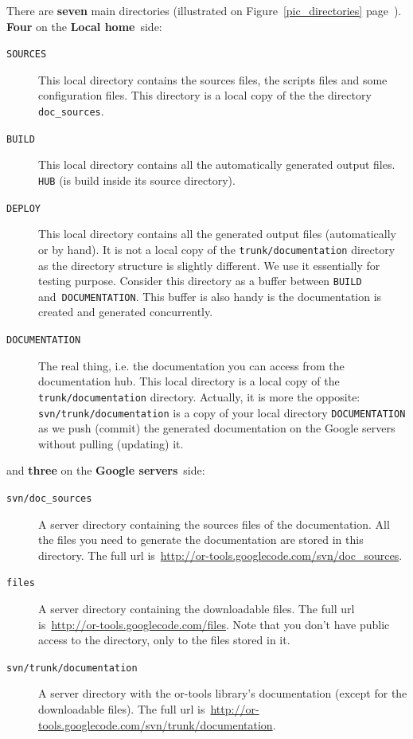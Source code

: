 \documentclass[a4paper,10pt]{article}
\newcommand{\code}[1]{\texttt{#1}}
\newcommand{\gservers}{{\bf Google servers}}
\newcommand{\lhome}{{\bf Local home}}
\begin{document}
There are {\bf seven} main directories (illustrated on Figure~\ref{pic_directories} page~\pageref{pic_directories}).\\

{\bf Four} on the \lhome\ side:

\begin{description}
 \item[\code{SOURCES}] This local directory contains the sources files, the scripts files and some configuration files. This directory is a local copy of the the directory \code{doc\_sources}.
 \item[\code{BUILD}] This local directory contains all the automatically generated output files.\\
\hspace{2cm}{\bf Exceptions:} \code{HUB} (is build inside its source directory).
 \item[\code{DEPLOY}]  This local directory contains all the generated output files (automatically or by hand). It is not a local copy of the \code{trunk/documentation} directory as the directory structure is slightly different. We use it essentially for testing purpose. Consider this directory as a buffer between \code{BUILD} and~\code{DOCUMENTATION}. This buffer is 
also handy is the documentation is created and generated concurrently.
 \item[\code{DOCUMENTATION}] The real thing, i.e. the documentation you can access from the documentation hub. This local directory is a local copy of the \code{trunk/documentation} directory. Actually, it is more the opposite: \code{svn/trunk/documentation} is a copy of your local directory \code{DOCUMENTATION} as we push (commit) the generated documentation on the Google servers without pulling (updating) it.
\end{description}

and {\bf three} on the \gservers\ side:

\begin{description}
 \item[\code{svn/doc\_sources}] A server directory containing the sources files of the documentation. All the files you need to generate the documentation are stored in this directory. The full url is~\href{http://or-tools.googlecode.com/svn/doc\_sources}{http://or-tools.googlecode.com/svn/doc\_sources}.
 \item[\code{files}] A server directory containing the downloadable files. The full url is~\href{http://or-tools.googlecode.com/files}{http://or-tools.googlecode.com/files}. Note that you don't have public access to the directory, only to the files stored in it.
 \item[\code{svn/trunk/documentation}] A server directory with the or-tools library's documentation (except for the downloadable files). The full url is~\href{http://or-tools.googlecode.com/svn/trunk/documentation}{http://or-tools.googlecode.com/svn/trunk/documentation}.
\end{description}
\end{document}
